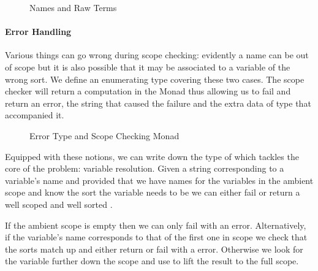 \begin{figure}[h]
\begin{minipage}{0.35\textwidth}
\end{minipage}
\begin{minipage}{0.55\textwidth}
\end{minipage}
\caption{Names and Raw Terms}
\end{figure}

\paragraph{Error Handling} Various things can go wrong during scope checking:
evidently a name can be out of scope but it is also possible that it may be
associated to a variable of the wrong sort. We define an enumerating type
covering these two cases. The scope checker will return a computation in the
Monad  thus allowing us to fail and return an error, the string that
caused the failure and the extra data of type  that accompanied it.

\begin{figure}[h]
\begin{minipage}{0.5\textwidth}
\end{minipage}
\begin{minipage}{0.4\textwidth}
\end{minipage}
\caption{Error Type and Scope Checking Monad}\label{fig:scopemonad}
\end{figure}

Equipped with these notions, we can write down the type of 
which tackles the core of the problem: variable resolution. Given a string
corresponding to a variable's name and provided that we have names for the
variables in the ambient scope and know the sort the variable needs to be
we can either fail or return a well scoped and well sorted .

If the ambient scope is empty then we can only fail with an  error.
Alternatively, if the variable's name corresponds to that of the first one
in scope we check that the sorts match up and either return  or fail
with a  error. Otherwise we look for the variable further
down the scope and use  to lift the result to the full scope.

